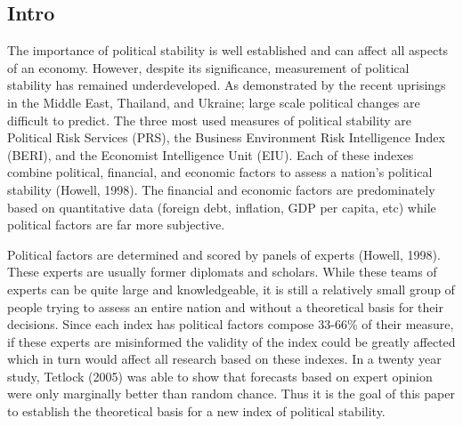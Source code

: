 \documentclass[12pt]{article}
\begin{document}
\begin{spacing}{1.5}



\section{Intro}
The importance of political stability is well established and can affect all aspects of an economy. However, despite its significance, measurement of political stability has remained underdeveloped. As demonstrated by the recent uprisings in the Middle East, Thailand, and Ukraine; large scale political changes are difficult to predict. The three most used measures of political stability are Political Risk Services (PRS), the Business Environment Risk Intelligence Index (BERI), and the Economist Intelligence Unit (EIU). Each of these indexes combine political, financial, and economic factors to assess a nation's political stability (Howell, 1998). The financial and economic factors are predominately based on quantitative data (foreign debt, inflation, GDP per capita, etc) while political factors are far more subjective. 

Political factors are determined and scored by panels of experts (Howell, 1998). These experts are usually former diplomats and scholars. While these teams of experts can be quite large and knowledgeable, it is still a relatively small group of people trying to assess an entire nation and without a theoretical basis for their decisions. Since each index has political factors compose 33-66\% of their measure, if these experts are misinformed the validity of the index could be greatly affected which in turn would affect all research based on these indexes. In a twenty year study, Tetlock (2005) was able to show that forecasts based on expert opinion were only marginally better than random chance. Thus it is the goal of this paper to establish the theoretical basis for a new index of political stability. 


\end{spacing}
\end{document}
